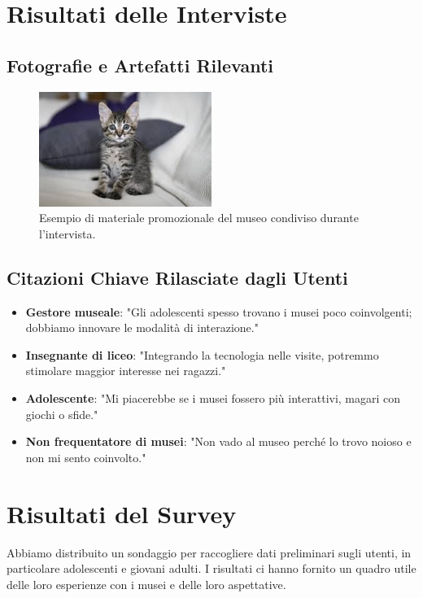 \documentclass{article}
\begin{document}
\section{Risultati delle Interviste}

\subsection{Fotografie e Artefatti Rilevanti}

\begin{figure}[h]
\centering
\includegraphics[width=0.5\textwidth]{p1.jpg}
\caption{Esempio di materiale promozionale del museo condiviso durante l'intervista.}
\end{figure}

\subsection{Citazioni Chiave Rilasciate dagli Utenti}

\begin{itemize}
    \item \textbf{Gestore museale}: "Gli adolescenti spesso trovano i musei poco coinvolgenti; dobbiamo innovare le modalità di interazione."
    \item \textbf{Insegnante di liceo}: "Integrando la tecnologia nelle visite, potremmo stimolare maggior interesse nei ragazzi."
    \item \textbf{Adolescente}: "Mi piacerebbe se i musei fossero più interattivi, magari con giochi o sfide."
    \item \textbf{Non frequentatore di musei}: "Non vado al museo perché lo trovo noioso e non mi sento coinvolto."
\end{itemize}

\section{Risultati del Survey}

Abbiamo distribuito un sondaggio per raccogliere dati preliminari sugli utenti, in particolare adolescenti e giovani adulti. I risultati ci hanno fornito un quadro utile delle loro esperienze con i musei e delle loro aspettative.
\end{document}
